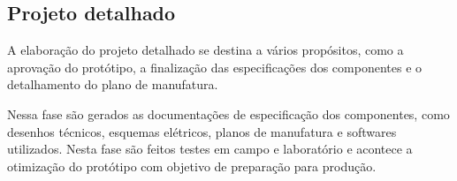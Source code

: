 \subsection{Projeto detalhado}

A elaboração do projeto detalhado se destina a vários propósitos, como a aprovação do protótipo, a finalização das especificações dos componentes e o detalhamento do plano
de manufatura. \autocite{Back2008}

Nessa fase são gerados as documentações de especificação dos componentes, como desenhos técnicos, esquemas elétricos, planos de manufatura e softwares utilizados. Nesta fase
são feitos testes em campo e laboratório e acontece a otimização do protótipo com objetivo de preparação para produção.

